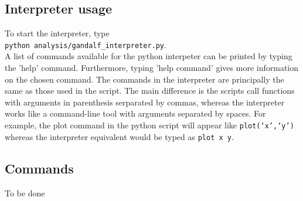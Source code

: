 \documentclass[a4paper]{article}
\newcommand{\var}[1]{\texttt{#1}}
\begin{document}
\subsection{Interpreter usage}

To start the interpreter, type \\
\newline
\noindent \var{python analysis/gandalf\_interpreter.py}. \\
\newline
A list of commands available for the python interpeter can be printed by typing the 'help' command.  Furthermore, typing 'help command' gives more information on the chosen command.  The commands in the interpreter are principally the same as those used in the script.  The main difference is the scripts call functions with arguments in parenthesis serparated by commas, whereas the interpreter works like a command-line tool with arguments separated by spaces.  For example, the plot command in the python script will appear like \var{plot(`x',`y')} whereas the interpreter equivalent would be typed as \var{plot x y}.





\subsection{Commands}
To be done



\end{document}
